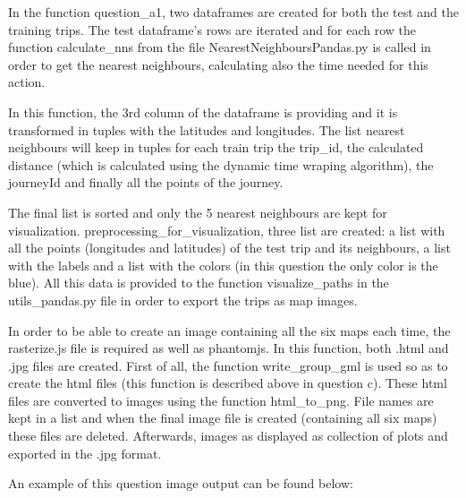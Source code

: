 \documentclass[12pt]{article}
\begin{document}
	In the function question\_a1, two dataframes are created for both the test and the training trips. The test dataframe's rows are iterated and for each row the function calculate\_nns from the file NearestNeighboursPandas.py is called in order to get the nearest neighbours, calculating also the time needed for this action.
	
	
	In this function, the 3rd column of the dataframe is providing and it is transformed in tuples with the latitudes and longitudes. The list nearest neighbours will keep in tuples for each train trip the trip\_id, the calculated distance (which is calculated using the dynamic time wraping algorithm), the journeyId and finally all the points of the journey. 
	
	The final list is sorted and only the 5 nearest neighbours are kept for visualization. preprocessing\_for\_visualization, three list are created: a list with all the points (longitudes and latitudes) of the test trip and its neighbours, a list with the labels and a list with the colors (in this question the only color is the blue). All this data is provided to the function visualize\_paths in the utils\_pandas.py file in order to export the trips as map images.
	
	In order to be able to create an image containing all the six maps each time, the rasterize.js file is required as well as phantomjs. In this function, both .html and .jpg files are created. First of all, the function write\_group\_gml is used so as to create the html files (this function is described above in question c). These html files are converted to images using the function html\_to\_png. File names are kept in a list and when the final image file is created (containing all six maps) these files are deleted. Afterwards, images as displayed as collection of plots and exported in the .jpg format.
	
	An example of this question image output can be found below:
	
\end{document}
